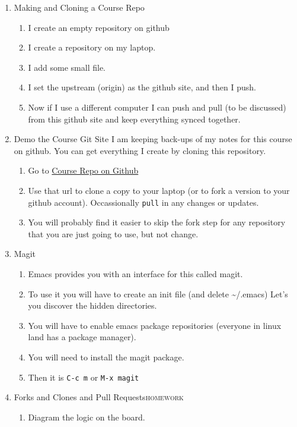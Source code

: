 \documentclass{article}
\begin{document}
\begin{enumerate}
\begin{enumerate}
\end{enumerate}
\item Making and Cloning a Course Repo
\label{sec:org16143cd}
\begin{enumerate}
\item I create an empty repository on github
\item I create a repository on my laptop.
\item I add some small file.
\item I set the upstream (origin) as the github site, and then I push.
\item Now if I use a different computer I can push and pull (to be discussed) from this github site and keep everything synced together.
\end{enumerate}
\item Demo the Course Git Site
\label{sec:org3bd26f6}
I am keeping back-ups of my notes for this course on github. You can get everything I create by cloning this repository.
\begin{enumerate}
\item Go to \href{https://github.com/brittAnderson/psych363}{Course Repo on Github}
\item Use that url to clone a copy to your laptop (or to fork a version to your github account). Occassionally \texttt{pull} in any changes or updates.
\item You will probably find it easier to skip the fork step for any repository that you are just going to use, but not change.
\end{enumerate}
\item Magit
\label{sec:orgb8c4a41}
\begin{enumerate}
\item Emacs provides you with an interface for this called magit.
\item To use it you will have to create an init file (and delete \textasciitilde{}/.emacs)
Let's you discover the hidden directories.
\item You will have to enable emacs package repositories (everyone in linux land has a package manager).
\item You will need to install the magit package.
\item Then it is \texttt{C-c m} or \texttt{M-x magit}
\end{enumerate}
\item Forks and Clones and Pull Requests\hfill{}\textsc{homework}
\label{sec:orgcf1189e}
\begin{enumerate}
\item Diagram the logic on the board.

\end{enumerate}
\end{enumerate}
\end{document}
